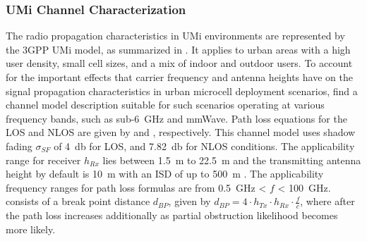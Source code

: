\subsubsection{UMi Channel Characterization} \label{UMi channel characterization}
The radio propagation characteristics in UMi environments are represented by the \ac{3GPP} UMi model, as summarized in . It applies to urban areas with a high user density, small cell sizes, and a mix of indoor and outdoor users. To account for the important effects that carrier frequency and antenna heights have on the signal propagation characteristics in urban microcell deployment scenarios, find a channel model description suitable for such scenarios operating at various frequency bands, such as sub-\SI{6}{\giga\hertz} and \ac{mmWave}. Path loss equations for the \ac{LOS} and \ac{NLOS} are given by  and , respectively. This channel model uses shadow fading $\sigma_{SF}$ of \SI{4}{\decibel} for \ac{LOS}, and \SI{7.82}{\decibel} for \ac{NLOS} conditions. The applicability range for receiver $h_{Rx}$ lies between \SI{1.5}{\meter} to \SI{22.5}{\meter} and the transmitting antenna height by default is \SI{10}{\meter} with an \ac{ISD} of up to \SI{500}{\meter} \cite{ETSI}. The applicability frequency ranges for path loss formulas are from \SI{0.5}{\giga\hertz} < $f$ < \SI{100}{\giga\hertz}.   consists of a break point distance $d_{BP}$, given by $d_{BP}= 4 \cdot h_{Tx} \cdot h_{Rx} \cdot \frac{f}{c}$, where after the path loss increases additionally as partial obstruction likelihood becomes more likely.
